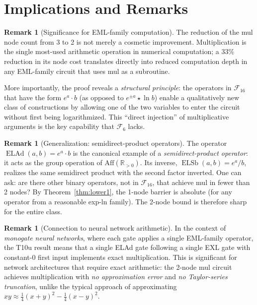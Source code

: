 \documentclass[12pt,a4paper]{article}
\theoremstyle{definition}
\newtheorem{remark}[theorem]{Remark}
\newcommand{\ELAd}{\operatorname{ELAd}}
\newcommand{\ELSb}{\operatorname{ELSb}}
\begin{document}
\section{Implications and Remarks}

\begin{remark}[Significance for EML-family computation]
The reduction of the mul node count from 3 to 2 is not merely a cosmetic
improvement.  Multiplication is the single most-used arithmetic operation
in numerical computation; a 33\% reduction in its node cost translates
directly into reduced computation depth in any EML-family circuit that
uses mul as a subroutine.

More importantly, the proof reveals a \emph{structural principle}: the
operators in $\mathcal{F}_{16}$ that have the form $e^a\cdot b$ (as opposed
to $e^{\pm a}\star\ln b$) enable a qualitatively new class of constructions
by allowing one of the two variables to enter the circuit without first
being logarithmized.  This ``direct injection'' of multiplicative arguments
is the key capability that $\mathcal{F}_6$ lacks.
\end{remark}

\begin{remark}[Generalization: semidirect-product operators]
The operator $\ELAd(a,b)=e^a\cdot b$ is the canonical example of a
\emph{semidirect-product operator}: it acts as the group operation of
$\mathrm{Aff}(\mathbb{R}_{>0})$.  Its inverse, $\ELSb(a,b)=e^a/b$, realizes
the same semidirect product with the second factor inverted.  One can ask:
are there other binary operators, not in $\mathcal{F}_{16}$, that achieve
mul in fewer than 2 nodes?  By Theorem~\ref{thm:lower1}, the 1-node barrier
is absolute (for any operator from a reasonable exp-ln family).  The 2-node
bound is therefore sharp for the entire class.
\end{remark}

\begin{remark}[Connection to neural network arithmetic]
In the context of \emph{monogate neural networks}, where each gate applies
a single EML-family operator, the T10u result means that a single ELAd gate
following a single EXL gate with constant-0 first input implements exact
multiplication.  This is significant for network architectures that require
exact arithmetic: the 2-node mul circuit achieves multiplication with
\emph{no approximation error} and \emph{no Taylor-series truncation}, unlike
the typical approach of approximating $xy\approx \tfrac14(x+y)^2-\tfrac14(x-y)^2$.
\end{remark}
\end{document}
